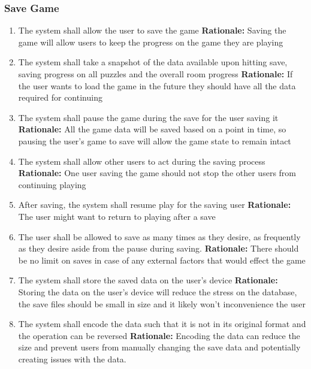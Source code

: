 \documentclass[12pt]{article}
\begin{document}
\subsubsection{Save Game}
\begin{enumerate}[label=SG\arabic*., series=StartGame]
	\item The system shall allow the user to save the game\newline 
    \textbf{Rationale:} Saving the game will allow users to keep the progress on the game they are playing
    \item The system shall take a snapshot of the data available upon hitting save, saving progress on all puzzles and the overall room progress \newline 
    \textbf{Rationale:} If the user wants to load the game in the future they should have all the data required for continuing
    \item The system shall pause the game during the save for the user saving it\newline 
    \textbf{Rationale:} All the game data will be saved based on a point in time, so pausing the user's game to save will allow the game state to remain intact
    \item The system shall allow other users to act during the saving process \newline 
    \textbf{Rationale:} One user saving the game should not stop the other users from continuing playing
    \item After saving, the system shall resume play for the saving user \newline 
    \textbf{Rationale:} The user might want to return to playing after a save
    \item The user shall be allowed to save as many times as they desire, as frequently as they desire aside from the pause during saving. \newline 
    \textbf{Rationale:} There should be no limit on saves in case of any external factors that would effect the game
    \item The system shall store the saved data on the user's device \newline 
    \textbf{Rationale:} Storing the data on the user's device will reduce the stress on the database, the save files should be small in size and it likely won't inconvenience the user
    \item The system shall encode the data such that it is not in its original format and the operation can be reversed \newline 
    \textbf{Rationale:} Encoding the data can reduce the size and prevent users from manually changing the save data and potentially creating issues with the data. 
\end{enumerate}
\end{document}
